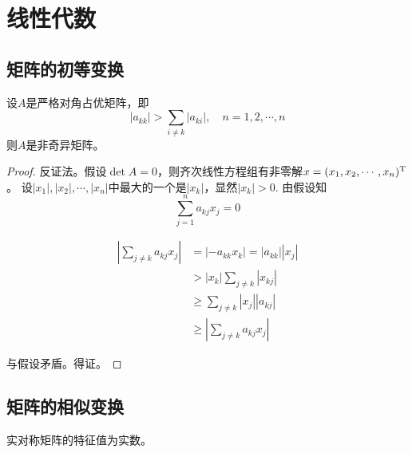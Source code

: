 \chapter{线性代数}

\section{矩阵的初等变换}

\begin{theorem}

    设$A$是严格对角占优矩阵，即
    $$|a_{kk}| > \sum\limits_{i \neq k}{|a_{ki}|}, \quad n = 1, 2, \cdots , n$$
    则$A$是非奇异矩阵。

\end{theorem}

\begin{proof}
    
    反证法。假设$\det A = 0$，则齐次线性方程组有非零解$x = (x_1, x_2, \cdots , x_n)^{\mathrm{T}}$。
    设$|x_1|, |x_2|, \cdots , |x_n|$中最大的一个是$|x_k|$，显然$|x_k| > 0$. 由假设知
    $$\sum\limits_{j = 1}^{n}{a_{kj}x_j}  = 0$$
    
    \begin{align*}
        \left| \sum\limits_{j \neq k}{a_{kj}x_j} \right| & = |-a_{kk}x_k| = |a_{kk}||x_j| \\ 
        & > |x_k| \sum\limits_{j \neq k}{|x_{kj}|} \\
        & \geq \sum\limits_{j \neq k}{|x_j||a_{kj}|} \\
        & \geq \left| \sum\limits_{j \neq k}{a_{kj}x_j} \right|
    \end{align*}

    与假设矛盾。得证。
    
\end{proof}

\section{矩阵的相似变换}

\begin{theorem}
    
    实对称矩阵的特征值为实数。

\end{theorem}

